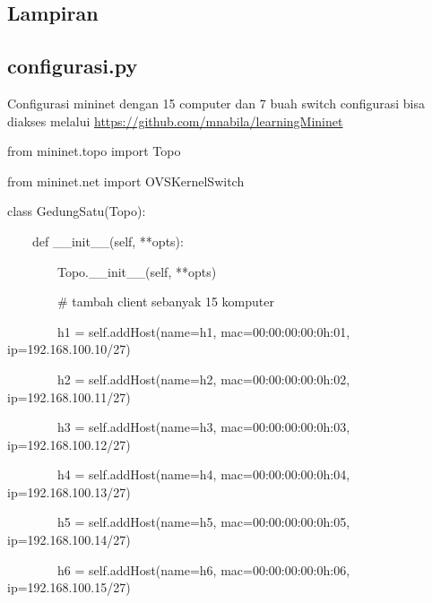 \begin{center}
\section{Lampiran}
\end{center}
\subsection{configurasi.py}
Configurasi mininet dengan 15 computer dan 7 buah switch
configurasi bisa diakses melalui \url{https://github.com/mnabila/learningMininet}

\bigskip

from mininet.topo import Topo

from mininet.net import OVSKernelSwitch

\bigskip

class GedungSatu(Topo):

\ \ \ \ def \_\_init\_\_(self, **opts):

\ \ \ \ \ \ \ \ Topo.\_\_init\_\_(self, **opts)

\bigskip

\ \ \ \ \ \ \ \ \# tambah client sebanyak 15 komputer

\ \ \ \ \ \ \ \ h1 = self.addHost(name={\textquotedbl}h1{\textquotedbl},
mac={\textquotedbl}00:00:00:00:0h:01{\textquotedbl}, ip={\textquotedbl}192.168.100.10/27{\textquotedbl})

\ \ \ \ \ \ \ \ h2 = self.addHost(name={\textquotedbl}h2{\textquotedbl},
mac={\textquotedbl}00:00:00:00:0h:02{\textquotedbl}, ip={\textquotedbl}192.168.100.11/27{\textquotedbl})

\ \ \ \ \ \ \ \ h3 = self.addHost(name={\textquotedbl}h3{\textquotedbl},
mac={\textquotedbl}00:00:00:00:0h:03{\textquotedbl}, ip={\textquotedbl}192.168.100.12/27{\textquotedbl})

\ \ \ \ \ \ \ \ h4 = self.addHost(name={\textquotedbl}h4{\textquotedbl},
mac={\textquotedbl}00:00:00:00:0h:04{\textquotedbl}, ip={\textquotedbl}192.168.100.13/27{\textquotedbl})

\ \ \ \ \ \ \ \ h5 = self.addHost(name={\textquotedbl}h5{\textquotedbl},
mac={\textquotedbl}00:00:00:00:0h:05{\textquotedbl}, ip={\textquotedbl}192.168.100.14/27{\textquotedbl})

\ \ \ \ \ \ \ \ h6 = self.addHost(name={\textquotedbl}h6{\textquotedbl},
mac={\textquotedbl}00:00:00:00:0h:06{\textquotedbl}, ip={\textquotedbl}192.168.100.15/27{\textquotedbl})

